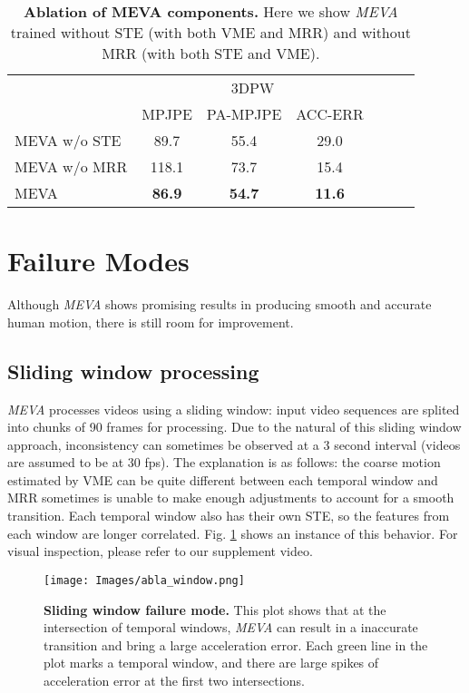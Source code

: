 \documentclass[runningheads]{llncs}
\begin{document}
\begin{table}[!thb]
\caption{\textbf{Ablation of MEVA components.} Here we show \textit{MEVA} trained without STE (with both VME and MRR) and without MRR (with both STE and VME).} \label{t:meva_abla_ste_mrr} 
\centering
\resizebox{3 in}{!} {
\begin{tabular}{l|c|c|c|c|c|r}
\hline
\multicolumn{1}{c|}{\multirow{2}{*}{}} & \multicolumn{3}{c|}{3DPW } \\ \cline{2-4} 
\multicolumn{1}{c|}{} & MPJPE  & PA-MPJPE  &  ACC-ERR  \\ \hline
    MEVA w/o STE   & 89.7 & 55.4 & 29.0 \\ 
    MEVA w/o MRR   & 118.1 & 73.7 & 15.4 \\ 
     MEVA   & \textbf{86.9} & \textbf{54.7} & \textbf{11.6}  \\
     \hline
\end{tabular}}
\end{table}



\section{Failure Modes}
Although \textit{MEVA} shows promising results in producing smooth and accurate human motion, there is still room for improvement. 

\subsection{Sliding window processing}
\textit{MEVA} processes videos using a sliding window: input video sequences are splited into chunks of 90 frames for processing. Due to the natural of this sliding window approach, inconsistency can sometimes be observed at a 3 second interval (videos are assumed to be at 30 fps). The explanation is as follows: the coarse motion estimated by VME can be quite different between each temporal window and MRR sometimes is unable to make enough adjustments to account for a smooth transition. Each temporal window also has their own STE, so the features from each window are longer correlated. Fig. \ref{fail_window} shows an instance of this behavior. For visual inspection, please refer to our supplement video. 

\begin{figure}[ht]
    \centering
    \texttt{[image: Images/abla\_window.png]}
    \caption{\textbf{Sliding window failure mode.} This plot shows that at the intersection of temporal windows, \textit{MEVA} can result in a inaccurate transition and bring a large acceleration error. Each green line in the plot marks a temporal window, and there are large spikes of acceleration error at the first two intersections.}
    \label{fail_window}
\end{figure}
\end{document}
